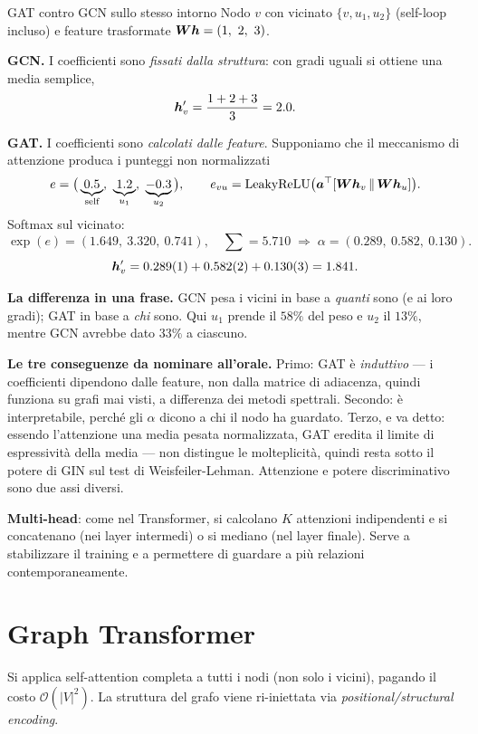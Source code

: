 \begin{esempiosvolto}{GAT contro GCN sullo stesso intorno}
Nodo $v$ con vicinato $\{v, u_1, u_2\}$ (self-loop incluso) e feature trasformate $\bm{W}\bm{h} = (1,\ 2,\ 3)$.

\medskip
\textbf{GCN.} I coefficienti sono \emph{fissati dalla struttura}: con gradi uguali si ottiene una media semplice,
\[
\bm{h}'_v = \frac{1 + 2 + 3}{3} = 2.0.
\]

\medskip
\textbf{GAT.} I coefficienti sono \emph{calcolati dalle feature}. Supponiamo che il meccanismo di attenzione produca i punteggi non normalizzati
\[
e = \big(\underbrace{0.5}_{\text{self}},\ \underbrace{1.2}_{u_1},\ \underbrace{-0.3}_{u_2}\big),
\qquad e_{vu} = \mathrm{LeakyReLU}\big(\vect{a}^\top [\mat{W}\vect{h}_v \,\|\, \mat{W}\vect{h}_u]\big).
\]
Softmax sul vicinato:
\[
\exp(e) = (1.649,\ 3.320,\ 0.741), \quad \textstyle\sum = 5.710
\;\Rightarrow\;
\alpha = (0.289,\ 0.582,\ 0.130).
\]
\[
\bm{h}'_v = 0.289(1) + 0.582(2) + 0.130(3) = 1.841.
\]

\medskip
\textbf{La differenza in una frase.} GCN pesa i vicini in base a \emph{quanti} sono (e ai loro gradi); GAT in base a \emph{chi} sono. Qui $u_1$ prende il $58\%$ del peso e $u_2$ il $13\%$, mentre GCN avrebbe dato $33\%$ a ciascuno.

\textbf{Le tre conseguenze da nominare all'orale.} Primo: GAT è \emph{induttivo} — i coefficienti dipendono dalle feature, non dalla matrice di adiacenza, quindi funziona su grafi mai visti, a differenza dei metodi spettrali. Secondo: è interpretabile, perché gli $\alpha$ dicono a chi il nodo ha guardato. Terzo, e va detto: essendo l'attenzione una media pesata normalizzata, GAT eredita il limite di espressività della media — non distingue le molteplicità, quindi resta sotto il potere di GIN sul test di Weisfeiler-Lehman. Attenzione e potere discriminativo sono due assi diversi.

\textbf{Multi-head}: come nel Transformer, si calcolano $K$ attenzioni indipendenti e si concatenano (nei layer intermedi) o si mediano (nel layer finale). Serve a stabilizzare il training e a permettere di guardare a più relazioni contemporaneamente.
\end{esempiosvolto}

\section{Graph Transformer}

Si applica self-attention completa a tutti i nodi (non solo i vicini), pagando il costo $\mathcal{O}(|V|^2)$. La struttura del grafo viene ri-iniettata via \emph{positional/structural encoding}.


